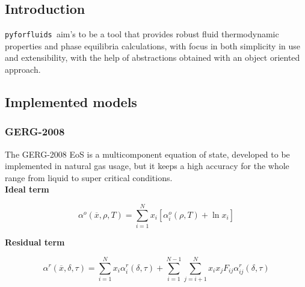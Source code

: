 \documentclass[a0,portrait]{a0poster}
\newcommand{\pff}{\texttt{pyforfluids }}
\newcommand{\conc}{\overline{x}}
\begin{document}
\begin{multicols}{2} %




\color{SaddleBrown} %

\section*{Introduction}
\pff aim's to be a tool that provides robust fluid thermodynamic properties and
phase equilibria calculations, with focus in both simplicity in use and
extensibility, with the help of abstractions obtained with an object oriented
approach.


\color{DarkSlateGray} %

\subsection*{Implemented models}

\subsubsection*{GERG-2008}
The GERG-2008 EoS is a multicomponent equation of state, developed to be
implemented in natural gas usage, but it keeps a high accuracy for the whole
range from liquid to super critical conditions.\\

\textbf{Ideal term}

\begin{equation}
    \label{eq:ideal_term}
    \alpha^o (\conc, \rho, T) = \sum_{i=1}^{N} x_i\left[
    \alpha_i^o(\rho, T) + \ln x_i
    \right] 
\end{equation}

\textbf{Residual term}

\begin{equation}
    \label{eq:residual_term}
    \alpha^r(\conc, \delta, \tau) = 
    \sum_{i=1}^N x_i \alpha_i^r(\delta, \tau) +
    \sum_{i=1}^{N-1}\sum_{j=i+1}^N x_i x_j F_{ij}\alpha_{ij}^r(\delta, \tau)
\end{equation}


\end{multicols}
\end{document}
